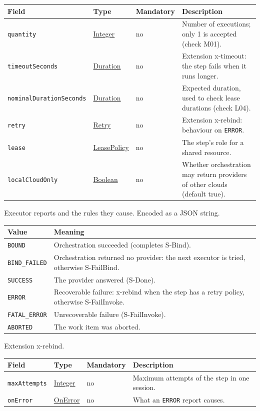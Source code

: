 \documentclass[a4paper]{arrowhead}
\newcommand{\mref}[1]{{\textcolor{ArrowheadPurple}{\hyperref[sec:model:#1]{#1}}}}
\newcommand{\pref}[1]{{\textcolor{ArrowheadGrey}{\hyperref[sec:model:primitives:#1]{#1}}}}
\begin{document}
{\small
\begin{longtable}{|p{3.7cm}|p{4.2cm}|p{1.6cm}|p{6.3cm}|}

\hline
\rowcolor{gray!33} Field & Type & Mandatory & Description \\ \hline
\endhead
\texttt{quantity} & \pref{Integer} & no & Number of executions; only 1 is accepted (check M01). \\ \hline
\texttt{timeoutSeconds} & \pref{Duration} & no & Extension x-timeout: the step fails when it runs longer. \\ \hline
\texttt{nominalDurationSeconds} & \pref{Duration} & no & Expected duration, used to check lease durations (check L04). \\ \hline
\texttt{retry} & \mref{Retry} & no & Extension x-rebind: behaviour on \texttt{ERROR}. \\ \hline
\texttt{lease} & \mref{LeasePolicy} & no & The step's role for a shared resource. \\ \hline
\texttt{localCloudOnly} & \pref{Boolean} & no & Whether orchestration may return providers of other clouds (default true). \\ \hline
\end{longtable}
}

Executor reports and the rules they cause.
 Encoded as a JSON string.
{\small
\begin{longtable}{|p{3.9cm}|p{11.9cm}|}

\hline
\rowcolor{gray!33} Value & Meaning \\ \hline
\endhead
\texttt{BOUND} & Orchestration succeeded (completes S-Bind). \\ \hline
\texttt{BIND\_FAILED} & Orchestration returned no provider: the next executor is tried, otherwise S-FailBind. \\ \hline
\texttt{SUCCESS} & The provider answered (S-Done). \\ \hline
\texttt{ERROR} & Recoverable failure: x-rebind when the step has a retry policy, otherwise S-FailInvoke. \\ \hline
\texttt{FATAL\_ERROR} & Unrecoverable failure (S-FailInvoke). \\ \hline
\texttt{ABORTED} & The work item was aborted. \\ \hline
\end{longtable}
}

Extension x-rebind.

{\small
\begin{longtable}{|p{3.7cm}|p{4.2cm}|p{1.6cm}|p{6.3cm}|}

\hline
\rowcolor{gray!33} Field & Type & Mandatory & Description \\ \hline
\endhead
\texttt{maxAttempts} & \pref{Integer} & no & Maximum attempts of the step in one session. \\ \hline
\texttt{onError} & \mref{OnError} & no & What an \texttt{ERROR} report causes. \\ \hline
\end{longtable}
}
\end{document}
